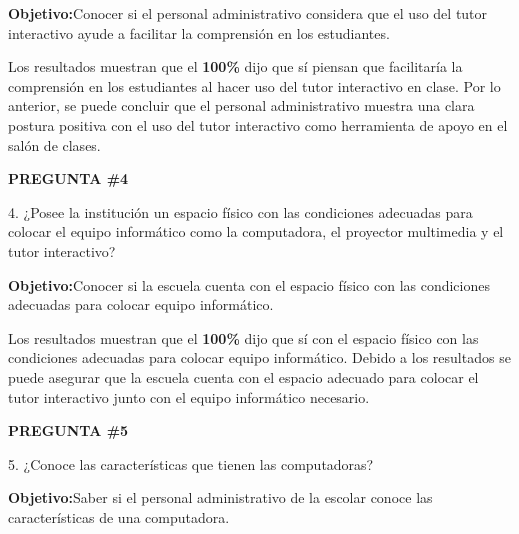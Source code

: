 \documentclass[12pt]{report}%
\begin{document}
\textbf{Objetivo:}Conocer si el personal administrativo considera que el uso del tutor interactivo ayude a facilitar la comprensión en los estudiantes.


\begin{center}
\end{center}


Los resultados muestran que el \textbf{ 100\%}  dijo que sí piensan que facilitaría la comprensión en los estudiantes al hacer uso del tutor interactivo en clase. Por lo anterior, se puede concluir que el personal administrativo muestra una clara postura positiva con el uso del tutor interactivo como herramienta de apoyo en el salón de clases.


\newpage
\textbf{PREGUNTA \#4}

4. ¿Posee la institución un espacio físico con las condiciones adecuadas para colocar el equipo informático como la computadora, el proyector multimedia y el tutor interactivo?

\textbf{Objetivo:}Conocer si la escuela cuenta con el espacio físico con las condiciones adecuadas para colocar equipo informático.

\begin{center}
\end{center}


Los resultados muestran que el \textbf{ 100\%} dijo que sí con el espacio físico con las condiciones adecuadas para colocar equipo informático. Debido a los resultados se puede asegurar que la escuela cuenta con el espacio adecuado para colocar el tutor interactivo junto con el equipo informático necesario.



\newpage
\textbf{PREGUNTA \#5}

5. ¿Conoce las características que tienen las computadoras?

\textbf{Objetivo:}Saber si el personal administrativo de la escolar conoce las características de una computadora.

\begin{center}
\end{center}
\end{document}
